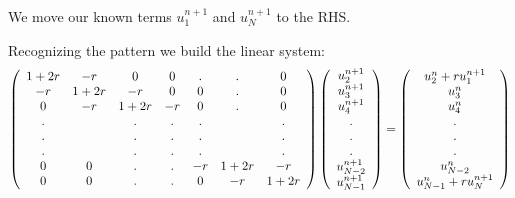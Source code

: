 \documentclass[compress]{beamer}
\begin{document}
\begin{frame}
We move our known terms $u_1^{n+1}$ and $u_N^{n+1}$ to the RHS. 
\vspace{.2in}

Recognizing the pattern we build the linear system:
\begingroup
\fontsize{6pt}{10pt}\selectfont
\[
\left(\begin{array}{c c c c c c c}  1+2r	&-r		&0		&0	&.	&.		&0		\\
										-r		&1+2r	&-r		&0	&0	&.		&0		\\
										0		&-r		&1+2r	&-r	&0	&.		&0		\\
										.		&		&.		&.	&.	&		&.		\\
										.		&		&.		&.	&.	&		&.		\\
										.		&		&.		&.	&.	&		&.		\\
										0		&0		&.		&.	&-r	&1+2r	&-r		\\
										0		&0		&.		&.	&0	&-r		&1+2r	\\ 
\end{array}\right)	
\left(\begin{array}{c} u_2^{n+1}\\u_3^{n+1}\\u_4^{n+1}\\.\\.\\.\\u_{N-2}^{n+1}\\u_{N-1}^{n+1}
\end{array}\right)
=\left(\begin{array}{c} u_2^n+ru_1^{n+1}\\u_3^n\\u_4^n\\.\\.\\.\\u_{N-2}^n\\u_{N-1}^n+ru_N^{n+1}
\end{array}\right)
\]
\endgroup
\end{frame}
\end{document}
